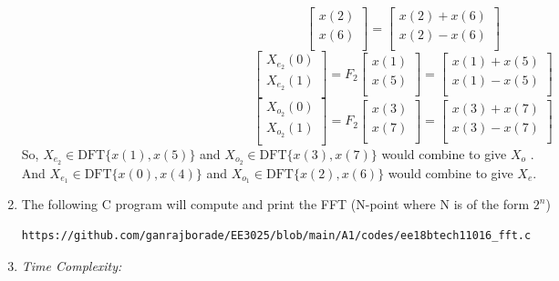 \documentclass[journal,12pt,twocolumn]{IEEEtran}
\renewcommand\thesection{\arabic{section}}
\begin{document}
\begin{enumerate}[label=\thesection.\arabic*.,ref=\thesection.\theenumi]
\begin{equation}
\begin{bmatrix}
x(2) \\ 
x(6) \\ 
\end{bmatrix}
=
\begin{bmatrix}
x(2)+x(6) \\ 
x(2)-x(6) \\ 
\end{bmatrix}
\end{equation}
\begin{equation}
\begin{bmatrix}
X_{e_{2}}(0) \\ 
X_{e_{2}}(1)\\ 
\end{bmatrix}
= F_{2}
\begin{bmatrix}
x(1) \\ 
x(5) \\ 
\end{bmatrix}
=
\begin{bmatrix}
x(1)+x(5) \\ 
x(1)-x(5) \\ 
\end{bmatrix}
\end{equation}
\begin{equation}
\begin{bmatrix}
X_{o_{2}}(0) \\ 
X_{o_{2}}(1)\\ 
\end{bmatrix}
= F_{2}
\begin{bmatrix}
x(3) \\ 
x(7) \\ 
\end{bmatrix}
=
\begin{bmatrix}
x(3)+x(7) \\ 
x(3)-x(7) \\ 
\end{bmatrix}
\end{equation}
So, $X_{e_{2}} \in \text{DFT} \{x(1),x(5)\}$ and $X_{o_{2}} \in \text{DFT} \{x(3),x(7)\}$ would combine to give $X_{o}$ .
\\And $X_{e_{1}} \in \text{DFT} \{x(0),x(4)\}$ and $X_{o_{1}} \in \text{DFT} \{x(2),x(6)\}$ would combine to give $X_{e}$.
\item The following C program will compute and print the FFT (N-point where N is of the form $2^{n}$)
\begin{lstlisting}
https://github.com/ganrajborade/EE3025/blob/main/A1/codes/ee18btech11016_fft.c
\end{lstlisting}
\item \emph{Time Complexity:}

\end{enumerate}
\end{document}

